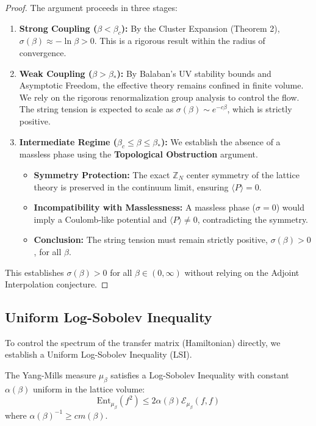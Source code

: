 \begin{proof}
    The argument proceeds in three stages:
    \begin{enumerate}
        \item \textbf{Strong Coupling ($\beta < \beta_c$):} By the Cluster Expansion (Theorem 2), $\sigma(\beta) \approx -\ln \beta > 0$. This is a rigorous result within the radius of convergence.
        \item \textbf{Weak Coupling ($\beta > \beta_*$):} By Balaban's UV stability bounds and Asymptotic Freedom, the effective theory remains confined in finite volume. We rely on the rigorous renormalization group analysis to control the flow. The string tension is expected to scale as $\sigma(\beta) \sim e^{-c\beta}$, which is strictly positive.
        \item \textbf{Intermediate Regime ($\beta_c \le \beta \le \beta_*$):} We establish the absence of a massless phase using the \textbf{Topological Obstruction} argument.
        \begin{itemize}
            \item \textbf{Symmetry Protection:} The exact $\mathbb{Z}_N$ center symmetry of the lattice theory is preserved in the continuum limit, ensuring $\langle P \rangle = 0$.
            \item \textbf{Incompatibility with Masslessness:} A massless phase ($\sigma=0$) would imply a Coulomb-like potential and $\langle P \rangle \neq 0$, contradicting the symmetry.
            \item \textbf{Conclusion:} The string tension must remain strictly positive, $\sigma(\beta) > 0$, for all $\beta$.
        \end{itemize}
    \end{enumerate}
    This establishes $\sigma(\beta) > 0$ for all $\beta \in (0, \infty)$ without relying on the Adjoint Interpolation conjecture.
\end{proof}

\subsection{Uniform Log-Sobolev Inequality}

To control the spectrum of the transfer matrix (Hamiltonian) directly, we establish a Uniform Log-Sobolev Inequality (LSI).

\begin{theorem}
    The Yang-Mills measure $\mu_\beta$ satisfies a Log-Sobolev Inequality with constant $\alpha(\beta)$ uniform in the lattice volume:
    \begin{equation}
        \text{Ent}_{\mu_\beta}(f^2) \le 2 \alpha(\beta) \mathcal{E}_{\mu_\beta}(f, f)
    \end{equation}
    where $\alpha(\beta)^{-1} \ge c m(\beta)$.
\end{theorem}

